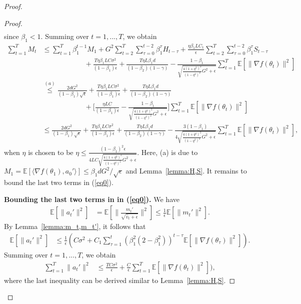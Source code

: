 \documentclass[11pt]{article}
\begin{document}
\begin{proof}
\begin{proof}
\begin{align*}
\end{align*}
since $\beta_1<1$. Summing over $t=1,...,T$, we obtain
\begin{align*}
    \sum_{t=1}^T M_t&\leq \sum_{t=1}^T \beta_1^{t-1} M_1+G^2\sum_{t=2}^T \sum_{\tau=0}^{t-2} \beta_1^\tau H_{t-\tau}+\frac{\eta \beta_1 LC_1}{\epsilon}\sum_{t=2}^T\sum_{\tau=0}^{t-2}\beta_1^\tau S_{t-\tau}\\
    &\hspace{1in} +\frac{T\eta \beta_1 LC\sigma^2}{(1-\beta_1)\epsilon}+\frac{T\eta L\beta_1 d}{(1-\beta_2)(1-\gamma)}-\frac{1-\beta_1}{\sqrt{\frac{4(1+q^2)^3}{(1-q^2)^2}G^2+\epsilon}}\sum_{t=1}^T \mathbb E[\|\nabla f(\theta_t)\|^2]\\
    &\overset{(a)}{\leq} \frac{2dG^2}{(1-\beta_1)\sqrt\epsilon}+\frac{T\eta \beta_1 LC\sigma^2}{(1-\beta_1)\epsilon}+\frac{T\eta L\beta_1 d}{(1-\beta_2)(1-\gamma)}\\
    &\hspace{1in} +\Big[\frac{\eta L C}{(1-\beta_1)\epsilon}- \frac{1-\beta_1}{\sqrt{\frac{4(1+q^2)^3}{(1-q^2)^2}G^2+\epsilon}}\Big]\sum_{t=1}^T \mathbb E[\|\nabla f(\theta_t)\|^2]\\
    &\leq \frac{2dG^2}{(1-\beta_1)\sqrt\epsilon}+\frac{T\eta \beta_1 LC\sigma^2}{(1-\beta_1)\epsilon}+\frac{T\eta L\beta_1 d}{(1-\beta_2)(1-\gamma)}- \frac{3(1-\beta_1)}{4\sqrt{\frac{4(1+q^2)^3}{(1-q^2)^2}G^2+\epsilon}}\sum_{t=1}^T \mathbb E[\|\nabla f(\theta_t)\|^2],
\end{align*}
when $\eta$ is chosen to be $\eta\leq\frac{(1-\beta_1)^2\epsilon}{4LC\sqrt{\frac{4(1+q^2)^3}{(1-q^2)^2}G^2+\epsilon}}$. Here, (a) is due to $M_1=\mathbb E[\langle\nabla f(\theta_1),a_0'\rangle]\leq \beta_1 d G^2/\sqrt{\epsilon}$ and Lemma~\ref{lemma:H,S}. It remains to bound the last two terms in (\ref{eq0}).

\textbf{Bounding the last two terms in  in (\ref{eq0}).} We have
\begin{align*}
    \mathbb E[\|a_t'\|^2]&=\mathbb E[\|\frac{m_t'}{\sqrt{\hat v_t+\epsilon}}\|^2]\leq \frac{1}{\epsilon}\mathbb E[\|m_t'\|^2].
\end{align*}
By Lemma~\ref{lemma:m_t,m_t'}, it follows that
\begin{align*}
    \mathbb E[\|a_t'\|^2]&\leq \frac{1}{\epsilon}(C\sigma^2+C_1 \sum_{\tau=1}^t (\beta_1^2(2-\beta_1^2))^{t-\tau}\mathbb E[\|\nabla f(\theta_\tau)\|^2]).
\end{align*}
Summing over $t=1,...,T$, we obtain
\begin{align*}
    \sum_{t=1}^T \|a_t'\|^2&\leq \frac{TC\sigma^2}{\epsilon}+\frac{C}{\epsilon} \sum_{t=1}^T \mathbb E[\|\nabla f(\theta_t)\|^2]),
\end{align*}
where the last inequality can be derived similar to Lemma~\ref{lemma:H,S}.


\end{proof}
\end{proof}
\end{document}
